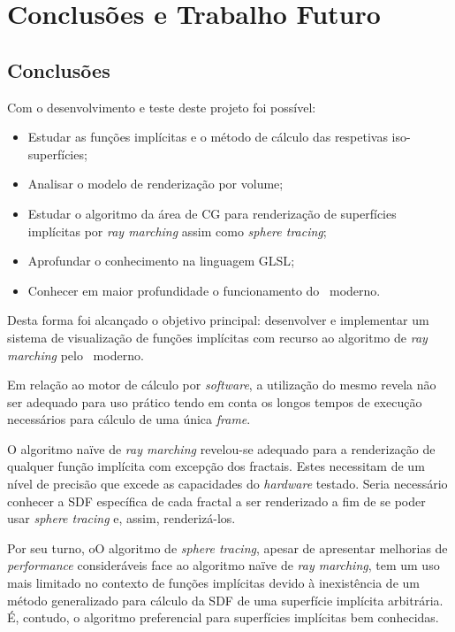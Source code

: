 \chapter{Conclusões e Trabalho Futuro}
\label{ch::conc}

\section{Conclusões}
\label{sec::conc:conc}

Com o desenvolvimento e teste deste projeto foi possível:
\begin{itemize}
    \item Estudar as funções implícitas e o método de cálculo das respetivas iso-superfícies;
    \item Analisar o modelo de renderização por volume;
    \item Estudar o algoritmo da área de \ac{CG} para renderização de superfícies implícitas por \textit{ray marching} assim como \textit{sphere tracing};
    \item Aprofundar o conhecimento na linguagem \ac{GLSL};
    \item Conhecer em maior profundidade o funcionamento do \opengl~moderno.
\end{itemize}

Desta forma foi alcançado o objetivo principal: desenvolver e implementar um sistema de visualização de funções implícitas com recurso ao algoritmo de \textit{ray marching} pelo \opengl~moderno.

Em relação ao motor de cálculo por \textit{software}, a utilização do mesmo revela não ser adequado para uso prático tendo em conta os longos tempos de execução necessários para cálculo de uma única \textit{frame}.

O algoritmo naïve de \textit{ray marching} revelou-se adequado para a renderização de qualquer função implícita com excepção dos fractais. Estes necessitam de um nível de precisão que excede as capacidades do \textit{hardware} testado. Seria necessário conhecer a \acs{SDF} específica de cada fractal a ser renderizado a fim de se poder usar \textit{sphere tracing} e, assim, renderizá-los.

Por seu turno, oO algoritmo de \textit{sphere tracing}, apesar de apresentar melhorias de \textit{performance} consideráveis face ao algoritmo naïve de \textit{ray marching}, tem um uso mais limitado no contexto de funções implícitas devido à inexistência de um método generalizado para cálculo da \acf{SDF} de uma superfície implícita arbitrária. É, contudo, o algoritmo preferencial para superfícies implícitas bem conhecidas.


